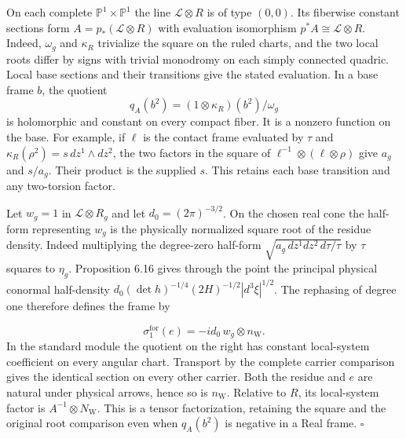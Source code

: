 \documentclass[
  english,
  11pt,
  reqno]{amsart}
\begin{document}
On each complete \(\mathbb P^1\times\mathbb P^1\) the line
\(\mathcal L\otimes R\) is of type \((0,0)\). Its fiberwise constant
sections form \(A=p_*(\mathcal L\otimes R)\) with evaluation isomorphism
\(p^*A\cong\mathcal L\otimes R\). Indeed, \(\omega_g\) and \(\kappa_R\)
trivialize the square on the ruled charts, and the two local roots
differ by signs with trivial monodromy on each simply connected quadric.
Local base sections and their transitions give the stated evaluation. In
a base frame \(b\), the quotient \[
q_A(b^2)=(1\otimes\kappa_R)(b^2)/\omega_g
\] is holomorphic and constant on every compact fiber. It is a nonzero
function on the base. For example, if \(\ell\) is the contact frame
evaluated by \(\tau\) and \(\kappa_R(\rho^2)=s\,dz^1\wedge dz^2\), the
two factors in the square of \(\ell^{-1}\otimes(\ell\otimes\rho)\) give
\(a_g\) and \(s/a_g\). Their product is the supplied \(s\). This retains
each base transition and any two-torsion factor.

Let \(w_g=1\) in \(\mathcal L\otimes R_g\) and let
\(d_0=(2\pi)^{-3/2}\). On the chosen real cone the half-form
representing \(w_g\) is the physically normalized square root of the
residue density. Indeed multiplying the degree-zero half-form
\(\sqrt{a_g\,dz^1dz^2\,d\tau/\tau}\) by \(\tau\) squares to \(\eta_g\).
Proposition 6.16 gives through the point the principal physical conormal
half-density \(d_0(\det h)^{-1/4}(2H)^{-1/2}|d^3\xi|^{1/2}\). The
rephasing of degree one therefore defines the frame by

\label{eq:relative-wave-native-frame} \[
\sigma^{\mathrm{for}}_1(e)=-i d_0\,w_g\otimes n_{\mathrm W}.
\] In the standard module the quotient on the right has constant
local-system coefficient on every angular chart. Transport by the
complete carrier comparison gives the identical section on every other
carrier. Both the residue and \(e\) are natural under physical arrows,
hence so is \(n_{\mathrm W}\). Relative to \(R\), its local-system
factor is \(A^{-1}\otimes N_{\mathrm W}\). This is a tensor
factorization, retaining the square and the original root comparison
even when \(q_A(b^2)\) is negative in a Real frame. \hfill\(\square\)
\end{document}
